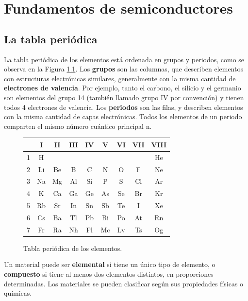 \chapter{Fundamentos de semiconductores}

\section{La tabla periódica}

La tabla periódica de los elementos está ordenada en grupos y periodos, como se observa en la Figura \ref{tabla_periodica_acs}. Los \textbf{grupos} son las columnas, que describen elementos con estructuras electrónicas similares, generalmente con la misma cantidad de \textbf{electrones de valencia}. Por ejemplo, tanto el carbono, el silicio y el germanio son elementos del grupo 14 (también llamado grupo IV por convención) y tienen todos 4 electrones de valencia. Los \textbf{periodos} son las filas, y describen elementos con la misma cantidad de capas electrónicas. Todos los elementos de un periodo comparten el mismo número cuántico principal n.

\begin{figure}[H]
    \centering
    \begin{tabular}{|c|c|c|c|c|c|c|c|c|}
        \hline   & I  & II & III & IV & V & VI & VII & VIII \\
        \hline 1 & H  &    &    &    &    &    &    & He \\
        \hline 2 & Li & Be & B  & C  & N  & O  & F  & Ne \\
        \hline 3 & Na & Mg & Al & Si & P  & S  & Cl & Ar \\
        \hline 4 & K  & Ca & Ga & Ge & As & Se & Br & Kr \\
        \hline 5 & Rb & Sr & In & Sn & Sb & Te & I  & Xe \\
        \hline 6 & Cs & Ba & Tl & Pb & Bi & Po & At & Rn \\
        \hline 7 & Fr & Ra & Nh & Fl & Mc & Lv & Ts & Og \\
        \hline 
    \end{tabular}
    \caption{Tabla periódica de los elementos.}
    \label{tabla_periodica_acs}
\end{figure}



Un material puede ser \textbf{elemental} si tiene un único tipo de elemento, o \textbf{compuesto} si tiene al menos dos elementos distintos, en proporciones determinadas. Los materiales se pueden clasificar según sus propiedades físicas o químicas.

